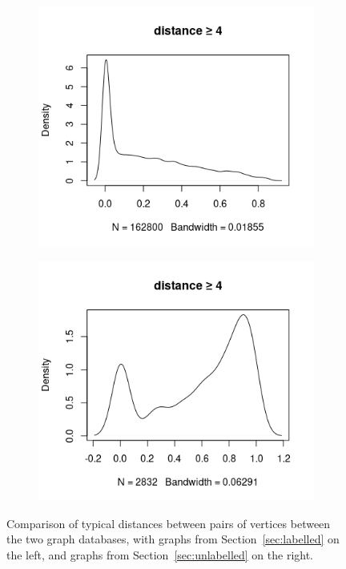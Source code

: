 \documentclass{l4proj}
\theoremstyle{definition}
\theoremstyle{remark}
\begin{document}
\begin{figure}
\begin{subfigure}[t]{0.49\textwidth}
    \centering
    \includegraphics[width=\textwidth]{images/mcs_prop4.png}
  \end{subfigure}
  \begin{subfigure}[t]{0.49\textwidth}
    \centering
    \includegraphics[width=\textwidth]{images/sip_prop4.png}
  \end{subfigure}
  \caption{Comparison of typical distances between pairs of vertices between the
  two graph databases, with graphs from Section~\ref{sec:labelled} on the left,
  and graphs from Section~\ref{sec:unlabelled} on the right.}
  \label{fig:proportions}
\end{figure}
\end{document}
